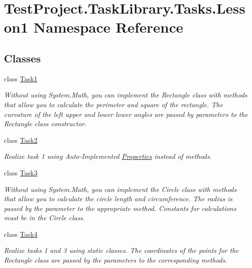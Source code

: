 \hypertarget{namespace_test_project_1_1_task_library_1_1_tasks_1_1_lesson1}{}\section{Test\+Project.\+Task\+Library.\+Tasks.\+Lesson1 Namespace Reference}
\label{namespace_test_project_1_1_task_library_1_1_tasks_1_1_lesson1}
\subsection*{Classes}
\begin{DoxyCompactItemize}
\item 
class \mbox{\hyperlink{class_test_project_1_1_task_library_1_1_tasks_1_1_lesson1_1_1_task1}{Task1}}
\begin{DoxyCompactList}\small\item\em Without using System.\+Math, you can implement the Rectangle class with methods that allow you to calculate the perimeter and square of the rectangle. The curvature of the left upper and lower lower angles are passed by parameters to the Rectangle class constructor. \end{DoxyCompactList}\item 
class \mbox{\hyperlink{class_test_project_1_1_task_library_1_1_tasks_1_1_lesson1_1_1_task2}{Task2}}
\begin{DoxyCompactList}\small\item\em Realize task 1 using Auto-\/\+Implemented \mbox{\hyperlink{namespace_test_project_1_1_task_library_1_1_properties}{Properties}} instead of methods. \end{DoxyCompactList}\item 
class \mbox{\hyperlink{class_test_project_1_1_task_library_1_1_tasks_1_1_lesson1_1_1_task3}{Task3}}
\begin{DoxyCompactList}\small\item\em Without using System.\+Math, you can implement the Circle class with methods that allow you to calculate the circle length and circumference. The radius is passed by the parameter to the appropriate method. Constants for calculations must be in the Circle class. \end{DoxyCompactList}\item 
class \mbox{\hyperlink{class_test_project_1_1_task_library_1_1_tasks_1_1_lesson1_1_1_task4}{Task4}}
\begin{DoxyCompactList}\small\item\em Realize tasks 1 and 3 using static classes. The coordinates of the points for the Rectangle class are passed by the parameters to the corresponding methods. \end{DoxyCompactList}\item 

\end{DoxyCompactItemize}
